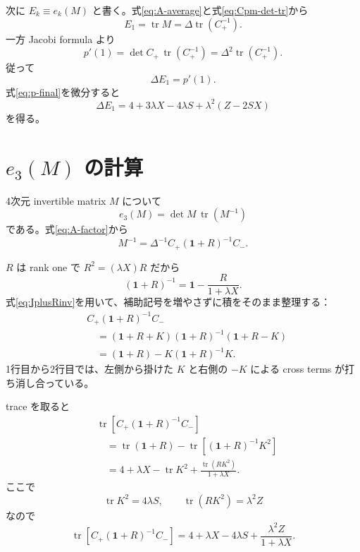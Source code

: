 \documentclass[a4paper,11pt]{ltjsreport}
\newcommand{\tr}{\operatorname{tr}}
\newcommand{\Id}{\mathbf 1}
\begin{document}
次に $E_k\equiv e_k(M)$ と書く。式\eqref{eq:A-average}と式\eqref{eq:Cpm-det-tr}から
\begin{equation}
 E_1=\tr M=\Delta\tr(C_+^{-1}).
 \label{eq:E1-C}
\end{equation}
一方 Jacobi formula より
\begin{equation}
 p'(1)=\det C_+\,\tr(C_+^{-1})=\Delta^2\tr(C_+^{-1}).
\end{equation}
従って
\begin{equation}
 \Delta E_1=p'(1).
\end{equation}
式\eqref{eq:p-final}を微分すると
\begin{equation}
 \Delta E_1
 =4+3\lambda X-4\lambda S
 +\lambda^2(Z-2SX)
 \label{eq:E1-field}
\end{equation}
を得る。

\section{\texorpdfstring{$e_3(M)$ の計算}{e3(M) の計算}}

4次元 invertible matrix $M$ について
\begin{equation}
 e_3(M)=\det M\,\tr(M^{-1})
 \label{eq:e3-inverse}
\end{equation}
である。式\eqref{eq:A-factor}から
\begin{equation}
 M^{-1}
 =\Delta^{-1}C_+(\Id+R)^{-1}C_-.
 \label{eq:Ainverse}
\end{equation}

$R$ は rank one で $R^2=(\lambda X)R$ だから
\begin{equation}
 (\Id+R)^{-1}
 =\Id-\frac{R}{1+\lambda X}.
 \label{eq:IplusRinv}
\end{equation}
式\eqref{eq:IplusRinv}を用いて、補助記号を増やさずに積をそのまま整理する：
\begin{align}
 &C_+(\Id+R)^{-1}C_-\nonumber\\
 &\quad=(\Id+R+K)(\Id+R)^{-1}(\Id+R-K)\\
 &\quad=(\Id+R)-K(\Id+R)^{-1}K.
 \label{eq:CHC}
\end{align}
1行目から2行目では、左側から掛けた $K$ と右側の $-K$ による cross terms が打ち消し合っている。

trace を取ると
\begin{align}
 &\tr\!\left[C_+(\Id+R)^{-1}C_-\right]\nonumber\\
 &\quad=\tr(\Id+R)-\tr\!\left[(\Id+R)^{-1}K^2\right]\\
 &\quad=4+\lambda X-\tr K^2
 +\frac{\tr(RK^2)}{1+\lambda X}.
\end{align}
ここで
\begin{equation}
 \tr K^2=4\lambda S,
 \qquad
 \tr(RK^2)=\lambda^2Z
\end{equation}
なので
\begin{equation}
 \tr\!\left[C_+(\Id+R)^{-1}C_-\right]
 =4+\lambda X-4\lambda S+
 \frac{\lambda^2Z}{1+\lambda X}.
 \label{eq:trace-Ainv}
\end{equation}
\end{document}
